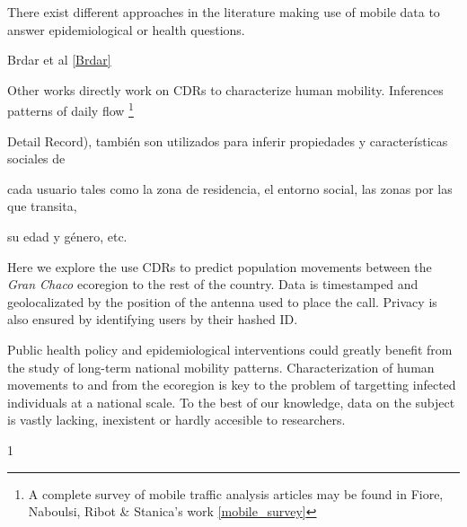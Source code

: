There exist different approaches in the literature making use of mobile data to answer epidemiological or health questions. \begin{comment} La siguiente info la saco de aqui  https://docs.google.com/document/d/1ZClgYFTLCxmg7wvRXqz2V1EP7Wcg0vd2ZwEBOLW2VOk \end{comment} Brdar et al \ref{Brdar}


Other works directly work on CDRs to characterize human mobility. Inferences patterns of daily flow 
\footnote{A complete survey of mobile traffic analysis articles may be found in Fiore, Naboulsi, Ribot & Stanica's work \ref{mobile_survey} }



Detail Record), también son utilizados para inferir propiedades y características sociales de

cada usuario tales como la zona de residencia, el entorno social, las zonas por las que transita,

su edad y género, etc.


Here we explore the use CDRs to predict population movements between the \textit{Gran Chaco} ecoregion to the rest of the country. Data is timestamped and geolocalizated by the position of the antenna used to place the call. Privacy is also ensured by identifying users by their hashed ID. \begin{comment}el tema de la privacidad es siempre tan importante que lo pongo aca... haria falta agregar que no tenemos acceso a las claves de encriptacion. \end{comment}

Public health policy and epidemiological interventions could greatly benefit from the study of long-term national mobility patterns. Characterization of human movements to and from the ecoregion is key to the problem of targetting infected individuals at a national scale. To the best of our knowledge, data on the subject is vastly lacking, inexistent or hardly accesible to researchers. 

1
